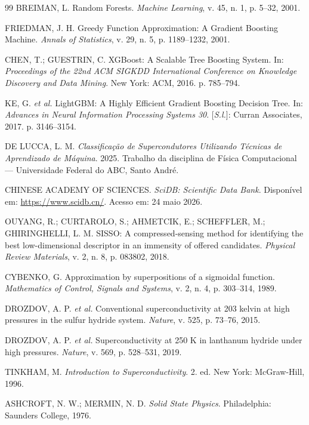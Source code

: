 \documentclass[12pt, a4paper, oneside]{report}
\begin{document}
\begin{thebibliography}{99}
 BREIMAN, L. Random Forests. \textit{Machine Learning}, v. 45, n. 1, p. 5--32, 2001.

 FRIEDMAN, J. H. Greedy Function Approximation: A Gradient Boosting Machine. \textit{Annals of Statistics}, v. 29, n. 5, p. 1189--1232, 2001.

 CHEN, T.; GUESTRIN, C. XGBoost: A Scalable Tree Boosting System. In: \textit{Proceedings of the 22nd ACM SIGKDD International Conference on Knowledge Discovery and Data Mining}. New York: ACM, 2016. p. 785--794.

 KE, G. \textit{et al.} LightGBM: A Highly Efficient Gradient Boosting Decision Tree. In: \textit{Advances in Neural Information Processing Systems 30}. [\textit{S.l.}]: Curran Associates, 2017. p. 3146--3154.

 DE LUCCA, L. M. \textit{Classificação de Supercondutores Utilizando Técnicas de Aprendizado de Máquina}. 2025. Trabalho da disciplina de Física Computacional --- Universidade Federal do ABC, Santo André.

 CHINESE ACADEMY OF SCIENCES. \textit{SciDB: Scientific Data Bank}. Disponível em: \url{https://www.scidb.cn/}. Acesso em: 24 maio 2026.

 OUYANG, R.; CURTAROLO, S.; AHMETCIK, E.; SCHEFFLER, M.; GHIRINGHELLI, L. M. SISSO: A compressed-sensing method for identifying the best low-dimensional descriptor in an immensity of offered candidates. \textit{Physical Review Materials}, v. 2, n. 8, p. 083802, 2018.

 CYBENKO, G. Approximation by superpositions of a sigmoidal function. \textit{Mathematics of Control, Signals and Systems}, v. 2, n. 4, p. 303--314, 1989.

 DROZDOV, A. P. \textit{et al.} Conventional superconductivity at 203 kelvin at high pressures in the sulfur hydride system. \textit{Nature}, v. 525, p. 73--76, 2015.

 DROZDOV, A. P. \textit{et al.} Superconductivity at 250 K in lanthanum hydride under high pressures. \textit{Nature}, v. 569, p. 528--531, 2019.

 TINKHAM, M. \textit{Introduction to Superconductivity}. 2. ed. New York: McGraw-Hill, 1996.

 ASHCROFT, N. W.; MERMIN, N. D. \textit{Solid State Physics}. Philadelphia: Saunders College, 1976.


\end{thebibliography}
\end{document}
